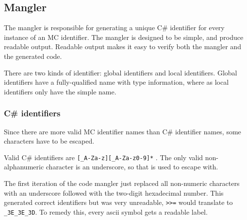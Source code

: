 \subsection{Mangler}
The mangler is responsible for generating a unique C\# identifier for every instance of an MC identifier.
The mangler is designed to be simple, and produce readable output.
Readable output makes it easy to verify both the mangler and the generated code.

There are two kinds of identifier: global identifiers and local identifiers.
Global identifiers have a fully-qualified name with type information, where as local identifiers only have the simple name.

\subsubsection{C\# identifiers}
Since there are more valid MC identifier names than C\# identifier names, some characters have to be escaped.

Valid C\# identifiers are \verb|[_A-Za-z][_A-Za-z0-9]*| \cite{msdn_identifiers}.
The only valid non-alphanumeric character is an underscore, so that is used to escape with.

The first iteration of the code mangler just replaced all non-numeric characters with an underscore followed with the two-digit hexadecimal number.
This generated correct identifiers but was very unreadable, \verb|>>=| would translate to \verb|_3E_3E_3D|.
To remedy this, every ascii symbol gets a readable label.


